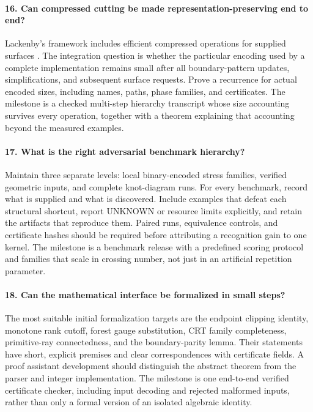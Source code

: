 \paragraph{16. Can compressed cutting be made representation-preserving end to end?}
Lackenby's framework includes efficient compressed operations for supplied
surfaces \cite{lackenby2026}. The integration question is whether the
particular encoding used by a complete implementation remains small after
all boundary-pattern updates, simplifications, and subsequent surface
requests. Prove a recurrence for actual encoded sizes, including names,
paths, phase families, and certificates. The milestone is a checked
multi-step hierarchy transcript whose size accounting survives every
operation, together with a theorem explaining that accounting beyond the
measured examples.

\paragraph{17. What is the right adversarial benchmark hierarchy?}
Maintain three separate levels: local binary-encoded stress families,
verified geometric inputs, and complete knot-diagram runs. For every
benchmark, record what is supplied and what is discovered. Include examples
that defeat each structural shortcut, report UNKNOWN or resource limits
explicitly, and retain the artifacts that reproduce them. Paired runs,
equivalence controls, and certificate hashes should be required before
attributing a recognition gain to one kernel. The milestone is a benchmark
release with a predefined scoring protocol and families that scale in
crossing number, not just in an artificial repetition parameter.

\paragraph{18. Can the mathematical interface be formalized in small steps?}
The most suitable initial formalization targets are the endpoint clipping
identity, monotone rank cutoff, forest gauge substitution, CRT family
completeness, primitive-ray connectedness, and the boundary-parity lemma.
Their statements have short, explicit premises and clear correspondences
with certificate fields. A proof assistant development should distinguish
the abstract theorem from the parser and integer implementation. The
milestone is one end-to-end verified certificate checker, including input
decoding and rejected malformed inputs, rather than only a formal version
of an isolated algebraic identity.

